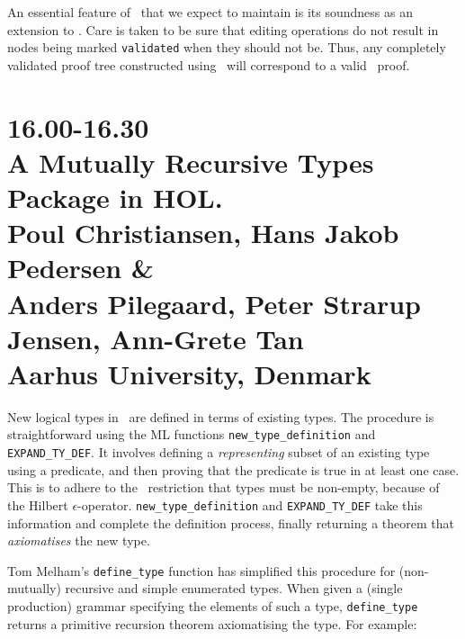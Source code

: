      An essential feature of \PM\ that we expect to maintain is its soundness
as an extension to \HOL.  Care is taken to be sure that editing operations
do not result in nodes being marked {\tt validated} when they should not be.
Thus, any completely validated proof tree constructed using \PM\ will
correspond to a valid \HOL\ proof.

\newpage
\section*{16.00-16.30\\
A Mutually Recursive Types Package in HOL.\\
Poul Christiansen, Hans Jakob Pedersen  \& \\
Anders Pilegaard, Peter Strarup Jensen, Ann-Grete Tan\\
\large\bf Aarhus University, Denmark\\}

New logical types in \HOL\ are defined in terms of existing types. The
procedure is straightforward using the ML functions
{\tt new\_type\_definition} and {\tt EXPAND\_TY\_DEF}. It involves
defining a {\em representing} subset of an existing type using a
predicate, and then proving that the predicate is  true in at least
one case. This is to adhere to the \HOL\ restriction that types must
be non-empty, because of the Hilbert $\epsilon$-operator.
{\tt new\_type\_definition} and {\tt EXPAND\_TY\_DEF} take this information 
and complete the definition process, finally returning a theorem that
{\em axiomatises} the new type.

Tom Melham's {\tt define\_type} function has simplified this procedure for
(non-mutually) recursive and simple enumerated types. When given a 
(single production) grammar specifying the elements of such a type, 
{\tt define\_type} returns a primitive recursion theorem 
axiomatising the type. For example:

\begin{center}
\end{center}

